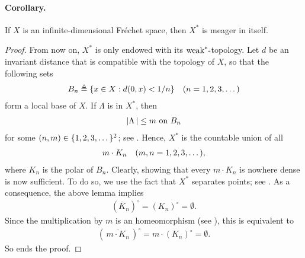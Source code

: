 \paragraph{Corollary.}%
If $X$ is an infinite-dimensional Fréchet space, %
then $X^\ast$ is meager in itself.
%
\begin{proof}%
From now on, $X^\ast$ is only endowed with its $\text{weak}^\ast\text{-}$topology. %
Let $d$ be an invariant distance that is compatible with the topology of $X$, %
so that the following sets
%
  \begin{align}
    B_n \triangleq \{x\in X: d(0, x) <  1/n\}\quad (n=1, 2, 3, \dots) 
  \end{align}
%
form a local base of $X$. %
%
If $\Lambda$ is in $X^\ast$, then %
%
  \begin{align}
    \left\lvert \Lambda \,\right\rvert \leq  m \text{ on } B_n
  \end{align}
%
for some $(n, m) \in \{1, 2, 3, \dots\}^2$; see . %
%
Hence, $X^\ast$ is the countable union of all %
%
  \begin{align}\label{3.11. Countable union.}
    m\cdot K_n \quad (m,n=1, 2, 3, \dots), 
  \end{align}
%
where $K_n$ is the polar of $B_n$. %
Clearly, showing that every $m\cdot K_n$ is nowhere dense %
is now sufficient. %
To do so, we use the fact that $X^\ast$ separates points; %
see . %
As a consequence, the above lemma implies %
%
  \begin{align}
    \left({\overline{K}_n}\right)^\circ = \left({{K}_n}\right)^\circ=\emptyset. 
  \end{align}
%
Since the multiplication by $m$ is an homeomorphism (see ), %
this is equivalent to %
%
  \begin{align}\label{3.11. Nowhere dense.}
    \left(\,{\overline{m\cdot K_n}}\, \right)^\circ 
      = 
    m\cdot \left({{K}_n}\right)^\circ 
      = 
    \emptyset.
  \end{align}
%
So ends the proof.%
\end{proof}